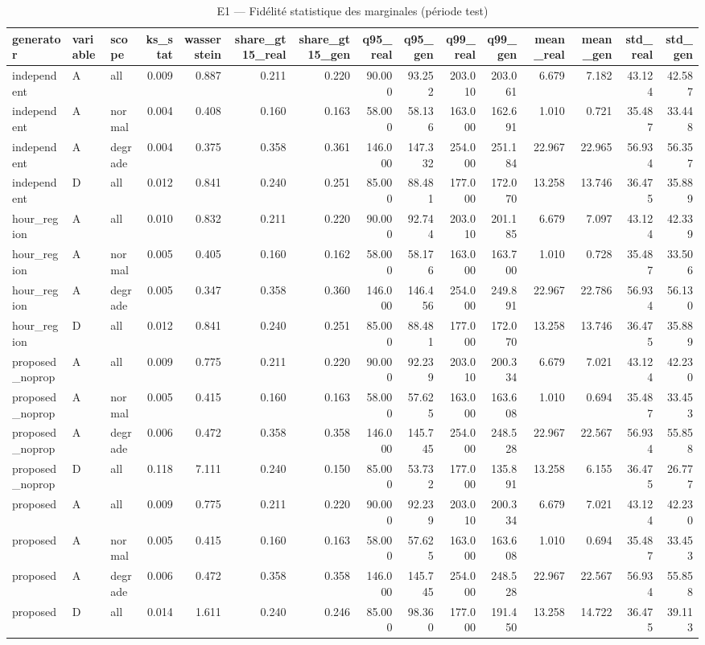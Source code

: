 \begin{table}
\caption{E1 — Fidélité statistique des marginales (période test)}
\label{tab:T1}
\begin{tabular}{lllrrrrrrrrrrrr}
\toprule
generator & variable & scope & ks\_stat & wasserstein & share\_gt15\_real & share\_gt15\_gen & q95\_real & q95\_gen & q99\_real & q99\_gen & mean\_real & mean\_gen & std\_real & std\_gen \\
\midrule
independent & A & all & 0.009 & 0.887 & 0.211 & 0.220 & 90.000 & 93.252 & 203.010 & 203.061 & 6.679 & 7.182 & 43.124 & 42.587 \\
independent & A & normal & 0.004 & 0.408 & 0.160 & 0.163 & 58.000 & 58.136 & 163.000 & 162.691 & 1.010 & 0.721 & 35.487 & 33.448 \\
independent & A & degrade & 0.004 & 0.375 & 0.358 & 0.361 & 146.000 & 147.332 & 254.000 & 251.184 & 22.967 & 22.965 & 56.934 & 56.357 \\
independent & D & all & 0.012 & 0.841 & 0.240 & 0.251 & 85.000 & 88.481 & 177.000 & 172.070 & 13.258 & 13.746 & 36.475 & 35.889 \\
hour\_region & A & all & 0.010 & 0.832 & 0.211 & 0.220 & 90.000 & 92.744 & 203.010 & 201.185 & 6.679 & 7.097 & 43.124 & 42.339 \\
hour\_region & A & normal & 0.005 & 0.405 & 0.160 & 0.162 & 58.000 & 58.176 & 163.000 & 163.700 & 1.010 & 0.728 & 35.487 & 33.506 \\
hour\_region & A & degrade & 0.005 & 0.347 & 0.358 & 0.360 & 146.000 & 146.456 & 254.000 & 249.891 & 22.967 & 22.786 & 56.934 & 56.130 \\
hour\_region & D & all & 0.012 & 0.841 & 0.240 & 0.251 & 85.000 & 88.481 & 177.000 & 172.070 & 13.258 & 13.746 & 36.475 & 35.889 \\
proposed\_noprop & A & all & 0.009 & 0.775 & 0.211 & 0.220 & 90.000 & 92.239 & 203.010 & 200.334 & 6.679 & 7.021 & 43.124 & 42.230 \\
proposed\_noprop & A & normal & 0.005 & 0.415 & 0.160 & 0.163 & 58.000 & 57.625 & 163.000 & 163.608 & 1.010 & 0.694 & 35.487 & 33.453 \\
proposed\_noprop & A & degrade & 0.006 & 0.472 & 0.358 & 0.358 & 146.000 & 145.745 & 254.000 & 248.528 & 22.967 & 22.567 & 56.934 & 55.858 \\
proposed\_noprop & D & all & 0.118 & 7.111 & 0.240 & 0.150 & 85.000 & 53.732 & 177.000 & 135.891 & 13.258 & 6.155 & 36.475 & 26.777 \\
proposed & A & all & 0.009 & 0.775 & 0.211 & 0.220 & 90.000 & 92.239 & 203.010 & 200.334 & 6.679 & 7.021 & 43.124 & 42.230 \\
proposed & A & normal & 0.005 & 0.415 & 0.160 & 0.163 & 58.000 & 57.625 & 163.000 & 163.608 & 1.010 & 0.694 & 35.487 & 33.453 \\
proposed & A & degrade & 0.006 & 0.472 & 0.358 & 0.358 & 146.000 & 145.745 & 254.000 & 248.528 & 22.967 & 22.567 & 56.934 & 55.858 \\
proposed & D & all & 0.014 & 1.611 & 0.240 & 0.246 & 85.000 & 98.360 & 177.000 & 191.450 & 13.258 & 14.722 & 36.475 & 39.113 \\
\bottomrule
\end{tabular}
\end{table}
